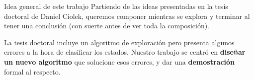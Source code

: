 \begin{frame}{Idea general de este trabajo}
    Partiendo de las ideas presentadas en la tesis doctoral de Daniel Ciolek, queremos componer mientras se explora y terminar al tener una conclusión (con suerte antes de ver toda la composición).
    \bigskip
    
    La tesis doctoral incluye un algoritmo de exploración pero presenta algunos errores a la hora de clasificar los estados. Nuestro trabajo se centró en \textbf{diseñar un nuevo algoritmo} que solucione esos errores, y dar una \textbf{demostración} formal al respecto.
    
\end{frame}
